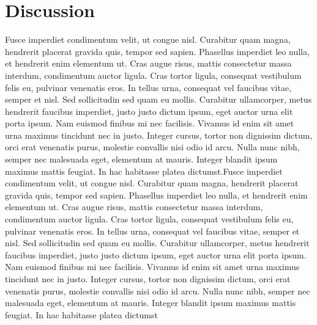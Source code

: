 \documentclass[letterpaper]{article}
\begin{document}
\begin{figure}[h]
\end{figure}

\section{Discussion}
Fusce imperdiet condimentum velit, ut congue nisl. Curabitur quam magna, hendrerit placerat gravida quis, tempor sed sapien. Phasellus imperdiet leo nulla, et hendrerit enim elementum ut. Cras augue risus, mattis consectetur massa interdum, condimentum auctor ligula. Cras tortor ligula, consequat vestibulum felis eu, pulvinar venenatis eros. In tellus urna, consequat vel faucibus vitae, semper et nisl. Sed sollicitudin sed quam eu mollis. Curabitur ullamcorper, metus hendrerit faucibus imperdiet, justo justo dictum ipsum, eget auctor urna elit porta ipsum. Nam euismod finibus mi nec facilisis. Vivamus id enim sit amet urna maximus tincidunt nec in justo. Integer cursus, tortor non dignissim dictum, orci erat venenatis purus, molestie convallis nisi odio id arcu. Nulla nunc nibh, semper nec malesuada eget, elementum at mauris. Integer blandit ipsum maximus mattis feugiat. In hac habitasse platea dictumst.Fusce imperdiet condimentum velit, ut congue nisl. Curabitur quam magna, hendrerit placerat gravida quis, tempor sed sapien. Phasellus imperdiet leo nulla, et hendrerit enim elementum ut. Cras augue risus, mattis consectetur massa interdum, condimentum auctor ligula. Cras tortor ligula, consequat vestibulum felis eu, pulvinar venenatis eros. In tellus urna, consequat vel faucibus vitae, semper et nisl. Sed sollicitudin sed quam eu mollis. Curabitur ullamcorper, metus hendrerit faucibus imperdiet, justo justo dictum ipsum, eget auctor urna elit porta ipsum. Nam euismod finibus mi nec facilisis. Vivamus id enim sit amet urna maximus tincidunt nec in justo. Integer cursus, tortor non dignissim dictum, orci erat venenatis purus, molestie convallis nisi odio id arcu. Nulla nunc nibh, semper nec malesuada eget, elementum at mauris. Integer blandit ipsum maximus mattis feugiat. In hac habitasse platea dictumst%


%
%
\end{document}
